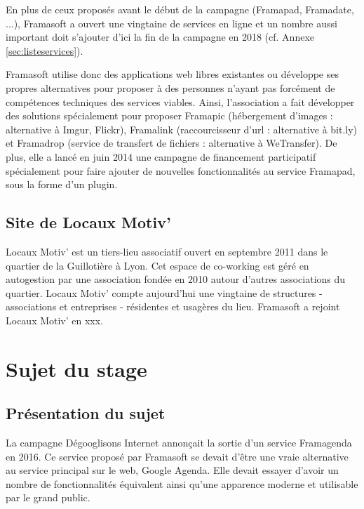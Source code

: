 \documentclass[10pt,a4paper, twoside]{report}
\begin{document}
	
	En plus de ceux proposés avant le début de la campagne (Framapad, Framadate, ...), Framasoft a ouvert une vingtaine de services en ligne et un nombre aussi important doit s'ajouter d'ici la fin de la campagne en 2018 (cf. Annexe \ref{sec:listeservices}).
	
	Framasoft utilise donc des applications web libres existantes ou développe ses propres alternatives pour proposer à des personnes n'ayant pas forcément de compétences techniques des services viables.
	Ainsi, l'association a fait développer des solutions spécialement pour proposer Framapic (hébergement d'images : alternative à Imgur, Flickr), Framalink (raccourcisseur d'url : alternative à bit.ly) et Framadrop (service de transfert de fichiers : alternative à WeTransfer). De plus, elle a lancé en juin 2014 une campagne de financement participatif spécialement pour faire ajouter de nouvelles fonctionnalités au service Framapad, sous la forme d'un plugin.
	
	\section{Site de Locaux Motiv'}
	Locaux Motiv' est un tiers-lieu associatif ouvert en septembre 2011 dans le quartier de la Guillotière à Lyon. Cet espace de co-working est géré en autogestion par une association fondée en 2010 autour d'autres associations du quartier.
	Locaux Motiv' compte aujourd’hui une vingtaine de structures - associations et entreprises - résidentes et usagères du lieu. Framasoft a rejoint Locaux Motiv' en xxx.
	
	\chapter{Sujet du stage}
	
	\section{Présentation du sujet}
	
	La campagne Dégooglisons Internet annonçait la sortie d'un service Framagenda en 2016. Ce service proposé par Framasoft se devait d'être une vraie alternative au service principal sur le web, Google Agenda. Elle devait essayer d'avoir un nombre de fonctionnalités équivalent ainsi qu'une apparence moderne et utilisable par le grand public.
	
\end{document}
